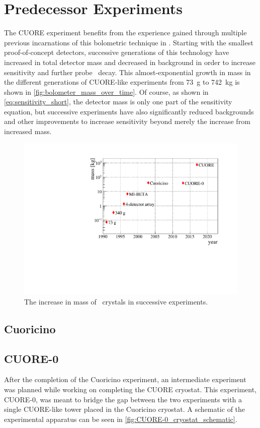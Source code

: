 \section{Predecessor Experiments}
\label{sec:Predecessor Experiments}
The CUORE experiment benefits from the experience gained through multiple previous incarnations of this bolometric technique in \teotwo.
Starting with the smallest proof-of-concept detectors, successive generations of this technology have increased in total detector mass and decreased in background in order to increase sensitivity and further probe \zeronubb~decay.
This almost-exponential growth in mass in the different generations of CUORE-like experiments from 73~g to 742~kg is shown in \autoref{fig:bolometer_mass_over_time}.
Of course, as shown in \autoref{eq:sensitivity_short}, the detector mass is only one part of the sensitivity equation, but successive experiments have also significantly reduced backgrounds and other improvements to increase sensitivity beyond merely the increase from increased mass. 
\begin{figure}[htbp]
    \centering
    \includegraphics[width=\linewidth]{Figures/bolometer_mass_over_time.pdf}
    \caption[The increase in mass of \teotwo~crystals in successive experiments.]
    {The increase in mass of \teotwo~crystals in successive experiments.}
    \label{fig:bolometer_mass_over_time}
\end{figure}
\subsection{Cuoricino}

\subsection{CUORE-0}
\label{ssec:CUORE-0}
After the completion of the Cuoricino experiment, an intermediate experiment was planned while working on completing the CUORE cryostat.
This experiment, CUORE-0, was meant to bridge the gap between the two experiments with a single CUORE-like tower placed in the Cuoricino cryostat.
A schematic of the experimental apparatus can be seen in \autoref{fig:CUORE-0_cryostat_schematic}.

